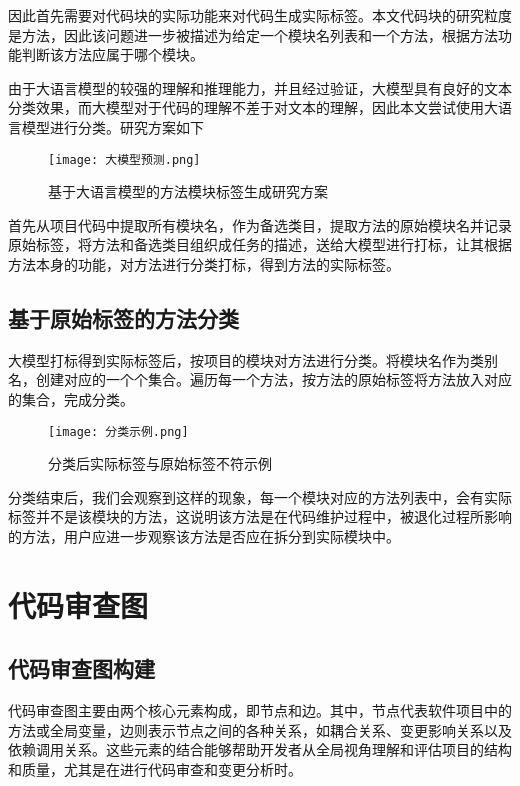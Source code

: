因此首先需要对代码块的实际功能来对代码生成实际标签。本文代码块的研究粒度是方法，因此该问题进一步被描述为给定一个模块名列表和一个方法，根据方法功能判断该方法应属于哪个模块。

由于大语言模型的较强的理解和推理能力，并且经过验证，大模型具有良好的文本分类效果\cite{wan-etal-2023-gpt}，而大模型对于代码的理解不差于对文本的理解，因此本文尝试使用大语言模型进行分类。研究方案如下

\begin{figure}[h]
\centering
\texttt{[image: 大模型预测.png]}
\caption{基于大语言模型的方法模块标签生成研究方案}
\end{figure}

首先从项目代码中提取所有模块名，作为备选类目，提取方法的原始模块名并记录原始标签，将方法和备选类目组织成任务的描述，送给大模型进行打标，让其根据方法本身的功能，对方法进行分类打标，得到方法的实际标签。


\subsection{基于原始标签的方法分类}

大模型打标得到实际标签后，按项目的模块对方法进行分类。将模块名作为类别名，创建对应的一个个集合。遍历每一个方法，按方法的原始标签将方法放入对应的集合，完成分类。

\begin{figure}[h]
\centering
\texttt{[image: 分类示例.png]}
\caption{分类后实际标签与原始标签不符示例}
\end{figure}

分类结束后，我们会观察到这样的现象，每一个模块对应的方法列表中，会有实际标签并不是该模块的方法，这说明该方法是在代码维护过程中，被退化过程所影响的方法，用户应进一步观察该方法是否应在拆分到实际模块中。


\section{代码审查图}

\subsection{代码审查图构建}

代码审查图主要由两个核心元素构成，即节点和边。其中，节点代表软件项目中的方法或全局变量，边则表示节点之间的各种关系，如耦合关系、变更影响关系以及依赖调用关系。这些元素的结合能够帮助开发者从全局视角理解和评估项目的结构和质量，尤其是在进行代码审查和变更分析时。

